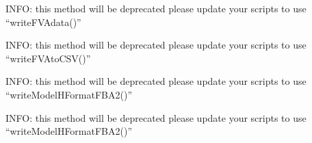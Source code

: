 \documentclass[a4paper,11pt,english]{sphinxmanual}
\begin{document}

\begin{fulllineitems}
\label{modules_doc:cbmpy.CBWrite.WriteFVAdata}
INFO: this method will be deprecated please update your scripts to use ``writeFVAdata()''

\end{fulllineitems}


\begin{fulllineitems}
\label{modules_doc:cbmpy.CBWrite.WriteFVAtoCSV}
INFO: this method will be deprecated please update your scripts to use ``writeFVAtoCSV()''

\end{fulllineitems}


\begin{fulllineitems}
\label{modules_doc:cbmpy.CBWrite.WriteModelHFormatFBA}
INFO: this method will be deprecated please update your scripts to use ``writeModelHFormatFBA2()''

\end{fulllineitems}


\begin{fulllineitems}
\label{modules_doc:cbmpy.CBWrite.WriteModelHFormatFBA2}
INFO: this method will be deprecated please update your scripts to use ``writeModelHFormatFBA2()''

\end{fulllineitems}
\end{document}
